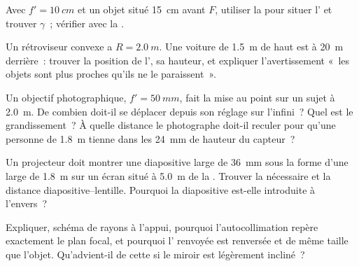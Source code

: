 \begin{exercise}[$\star$]\label{exo:b1:mirrors-thin-lenses:4}
Avec $f' = \qty{10}{cm}$ et un objet situé \qty{15}{cm} avant $F$,
utiliser la  pour situer l' et trouver $\gamma$~;
vérifier avec la .
\end{exercise}

\begin{exercise}[$\star\star$]\label{exo:b1:mirrors-thin-lenses:5}
Un rétroviseur convexe a $R = \qty{2.0}{m}$. Une voiture de \qty{1.5}{m}
de haut est à \qty{20}{m} derrière~: trouver la position de l', sa
hauteur, et expliquer l'avertissement «~les objets sont plus proches
qu'ils ne le paraissent~».
\end{exercise}

\begin{exercise}[$\star\star$]\label{exo:b1:mirrors-thin-lenses:6}
Un objectif photographique, $f' = \qty{50}{mm}$, fait la mise au point
sur un sujet à \qty{2.0}{m}. De combien doit-il se déplacer depuis son
réglage sur l'infini~? Quel est le grandissement~? À quelle distance le
photographe doit-il reculer pour qu'une personne de \qty{1.8}{m} tienne
dans les \qty{24}{mm} de hauteur du capteur~?
\end{exercise}

\begin{exercise}[$\star\star$]\label{exo:b1:mirrors-thin-lenses:7}
Un projecteur doit montrer une diapositive large de \qty{36}{mm} sous la
forme d'une  large de \qty{1.8}{m} sur un écran situé à \qty{5.0}{m}
de la . Trouver la  nécessaire et la distance
diapositive--lentille. Pourquoi la diapositive est-elle introduite à
l'envers~?
\end{exercise}

\begin{exercise}[$\star\star$]\label{exo:b1:mirrors-thin-lenses:8}
Expliquer, schéma de rayons à l'appui, pourquoi l'autocollimation repère
exactement le plan focal, et pourquoi l' renvoyée est renversée et
de même taille que l'objet. Qu'advient-il de cette  si le miroir
est légèrement incliné~?
\end{exercise}

